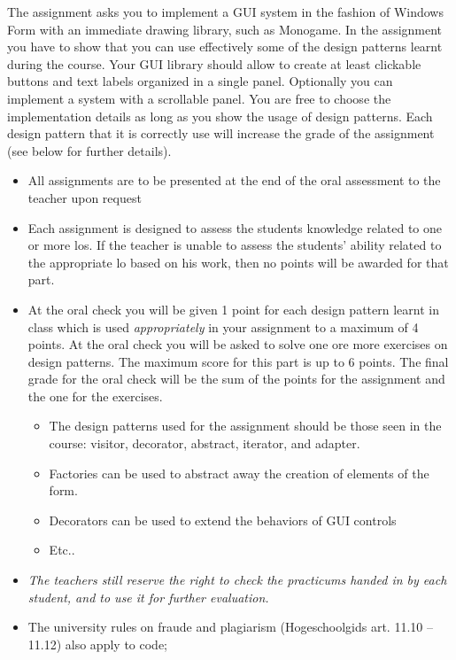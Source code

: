 The assignment asks you to implement a GUI system in the fashion of Windows Form with an immediate drawing library, such as Monogame. In the assignment you have to show that you can use effectively some of the design patterns learnt during the course. Your GUI library should allow to create at least clickable buttons and text labels organized in a single panel. Optionally you can implement a system with a scrollable panel. You are free to choose the implementation details as long as you show the usage of design patterns. Each design pattern that it is correctly use will increase the grade of the assignment (see below for further details).

\begin{itemize}
  \item All assignments are to be presented at the end of the oral assessment to the teacher upon request
  \item Each assignment is designed to assess the students knowledge related to one or more \glspl{lo}.
          If the teacher is unable to assess the students' ability related to the appropriate \gls{lo} based on his work, then no points will be awarded for that part.
  \item At the oral check you will be given 1 point for each design pattern learnt in class which is used \textit{appropriately} in your assignment to a maximum of 4 points. At the oral check you will be asked to solve one ore more exercises on design patterns. The maximum score for this part is up to 6 points. The final grade for the oral check will be the sum of the points for the assignment and the one for the exercises.
  \begin{itemize}
  	\item The design patterns used for the assignment should be those seen in the course: visitor, decorator, abstract, iterator, and adapter.
  	\item Factories can be used to abstract away the creation of elements of the form.
  	\item Decorators can be used to extend the behaviors of GUI controls
  	\item Etc..  	
  \end{itemize}
  \item \textit{The teachers still reserve the right to check the practicums handed in by each student, and to use it for further evaluation.}
  \item The university rules on fraude and plagiarism (Hogeschoolgids art. 11.10 -- 11.12) also apply to code;
\end{itemize}
